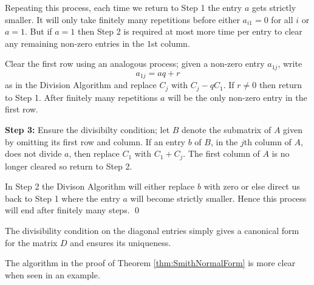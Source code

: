 \documentclass[../algebraNotesMSRI-UP2016.tex]{subfiles}
\begin{document}
\begin{frame}
Repeating this process, each time we return to Step 1 the entry $a$ gets strictly smaller.  It will only take finitely many repetitions before either $a_{i1}=0$ for all $i$ or $a=1$.  But if $a=1$ then Step 2 is required at most more time per entry to clear any remaining non-zero entries in the $1$st column.  

\smallGap
Clear the first row using an analogous process; given a non-zero entry $a_{1j}$, write
\[
a_{1j}=aq+r
\]
as in the Division Algorithm and replace $C_j$ with $C_j-qC_1$.  If $r\neq 0$ then return to Step 1.  After finitely many repetitions $a$ will be the only non-zero entry in the first row.

\smallGap
\textbf{Step 3:} Ensure the divisibilty condition; let $B$ denote the submatrix of $A$ given by omitting its first row and column.  If an entry $b$ of $B$, in the $j$th column of $A$, does not divide $a$, then replace $C_1$ with $C_1+C_j$.  The first column of $A$ is no longer cleared so return to Step 2.
\end{frame}

\begin{frame}[c]
In Step 2 the Divison Algorithm will either replace $b$ with zero or else direct us back to Step 1 where the entry $a$ will become strictly smaller.  Hence this process will end after finitely many steps.
\qed

\smallGap
The divisibility condition on the diagonal entries simply gives a canonical form for the matrix $D$ and ensures its uniqueness.

\smallGap 
The algorithm in the proof of Theorem \ref{thm:SmithNormalForm} is more clear when seen in an example.
\end{frame}
\end{document}
